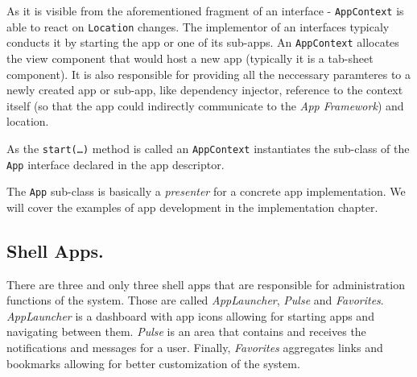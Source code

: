 As it is visible from the aforementioned fragment of an interface -
\texttt{AppContext} is able to react on \texttt{Location} changes. The
implementor of an interfaces typicaly conducts it by starting the app or one of
its sub-apps. An \texttt{AppContext} allocates the view component that would
host a new app (typically it is a tab-sheet component). It is also responsible
for providing all the neccessary paramteres to a newly created app or sub-app,
like dependency injector, reference to the context itself (so that the app could
indirectly communicate to the \emph{App Framework}) and location.

As the \texttt{start(\ldots)} method is called an \texttt{AppContext}
instantiates the sub-class of the \texttt{App} interface declared in the app
descriptor.

The \texttt{App} sub-class is basically a \emph{presenter} for a concrete app
implementation. We will cover the examples of app development in the
implementation chapter.

\subsection{Shell Apps.} There are three and only three shell apps that are
responsible for administration functions of the system. Those are called
\emph{AppLauncher}, \emph{Pulse} and \emph{Favorites}. \emph{AppLauncher} is a
dashboard with app icons allowing for starting apps and navigating between them.
\emph{Pulse} is an area that contains and receives the notifications and messages for a
user. Finally, \emph{Favorites} aggregates links and bookmarks allowing for better
customization of the system.